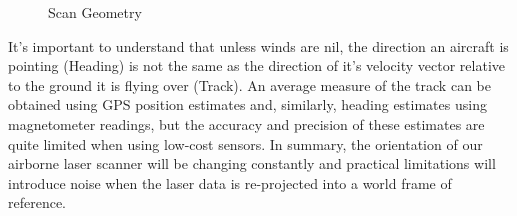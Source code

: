 \documentclass[a4paper,11pt]{report}
\begin{document}
\begin{figure}[ht]
  \centering
  \caption{Scan Geometry}
  \label{fig:geometry}
\end{figure}

It's important to understand that unless winds are nil, the direction an aircraft is pointing (Heading) is not the same as the direction of it's velocity vector relative to the ground it is flying over (Track). An average measure of the track can be obtained using GPS position estimates and, similarly, heading estimates using magnetometer readings, but the accuracy and precision of these estimates are quite limited when using low-cost sensors. In summary, the orientation of our airborne laser scanner will be changing constantly and practical limitations will introduce noise when the laser data is re-projected into a world frame of reference.
\end{document}
